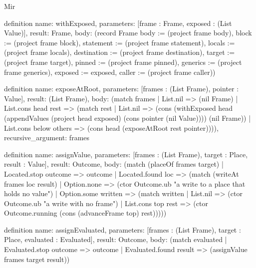 \begin{lexlean}{Mir}
\begin{semanticmodule}
definition{
  name: withExposed,
  parameters: [frame : Frame, exposed : (List Value)],
  result: Frame,
  body: (record Frame {body := (project frame body), block := (project frame block), statement := (project frame statement), locals := (project frame locals), destination := (project frame destination), target := (project frame target), pinned := (project frame pinned), generics := (project frame generics), exposed := exposed, caller := (project frame caller)})
}

definition{
  name: exposeAtRoot,
  parameters: [frames : (List Frame), pointer : Value],
  result: (List Frame),
  body: (match frames
    | List.nil => (nil Frame)
    | List.cons head rest => (match rest
      | List.nil => (cons (withExposed head (appendValues (project head exposed) (cons pointer (nil Value)))) (nil Frame))
      | List.cons below others => (cons head (exposeAtRoot rest pointer)))),
  recursive_argument: frames
}

definition{
  name: assignValue,
  parameters: [frames : (List Frame), target : Place, result : Value],
  result: Outcome,
  body: (match (placeOf frames target)
    | Located.stop outcome => outcome
    | Located.found loc => (match (writeAt frames loc result)
      | Option.none => (ctor Outcome.ub "a write to a place that holds no value")
      | Option.some written => (match written
        | List.nil => (ctor Outcome.ub "a write with no frame")
        | List.cons top rest => (ctor Outcome.running (cons (advanceFrame top) rest)))))
}

definition{
  name: assignEvaluated,
  parameters: [frames : (List Frame), target : Place, evaluated : Evaluated],
  result: Outcome,
  body: (match evaluated
    | Evaluated.stop outcome => outcome
    | Evaluated.found result => (assignValue frames target result))
}


\end{semanticmodule}
\end{lexlean}
